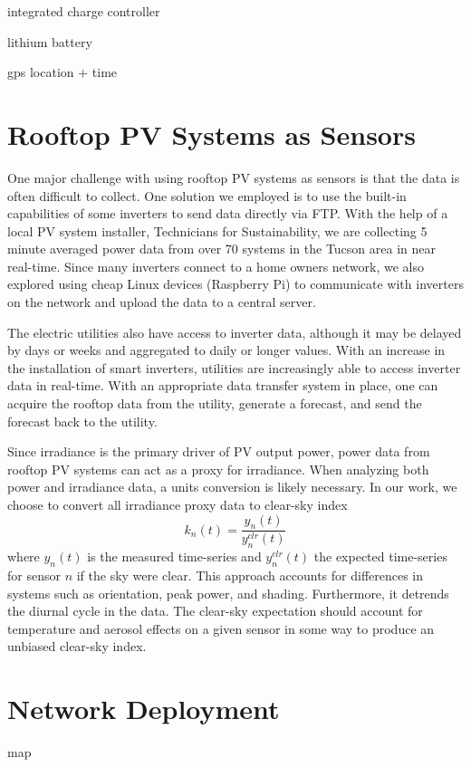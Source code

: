 integrated charge controller

lithium battery

gps location + time


\section{Rooftop PV Systems as Sensors}

One major challenge with using rooftop PV systems as sensors is that
the data is often difficult to collect.
One solution we employed is to use the built-in capabilities of some
inverters to send data directly via FTP.
With the help of a local PV system installer, Technicians for
Sustainability, we are collecting 5 minute averaged power data from
over 70 systems in the Tucson area in near real-time.
Since many inverters connect to a home owners network, we also
explored using cheap Linux devices (Raspberry Pi) to communicate with
inverters on the network and upload the data to a central server.

The electric utilities also have access to inverter data, although it
may be delayed by days or weeks and aggregated to daily or longer values.
With an increase in the installation of smart inverters, utilities are
increasingly able to access inverter data in real-time.
With an appropriate data transfer system in place, one can acquire
the rooftop data from the utility, generate a forecast, and send the
forecast back to the utility.

Since irradiance is the primary driver of PV output power, power data
from rooftop PV systems can act as a proxy for irradiance.
When analyzing both power and irradiance data, a units conversion is
likely necessary.
In our work, we choose to convert all irradiance proxy data to
clear-sky index
\begin{equation}
\label{eq:clrind}
k_n(t) = \frac{y_n(t)}{y_n^{clr}(t)}
\end{equation}
where $y_n(t)$ is the measured time-series and $y_n^{clr}(t)$ the
expected time-series for sensor $n$ if the sky were clear.
This approach accounts for differences in systems such as orientation,
peak power, and shading.
Furthermore, it detrends the diurnal cycle in the data.
The clear-sky expectation should account for temperature and aerosol
effects on a given sensor in some way to produce an unbiased clear-sky
index.

\section{Network Deployment}
map

